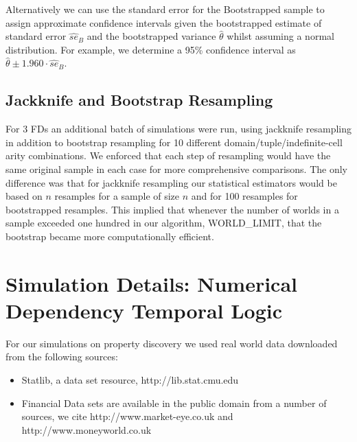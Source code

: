 \medskip

Alternatively we can use the standard error for the Bootstrapped
sample to assign approximate confidence intervals given the
bootstrapped estimate of standard error $\hat{se}_B$ and the bootstrapped variance $\hat{\theta}$ 
whilst assuming a normal distribution.  For example, we determine a 95\% 
confidence interval as $\hat{\theta} \pm 1.960 \cdot \hat{se}_B$.

\subsection{Jackknife and Bootstrap Resampling}

For 3 FDs an additional batch of simulations were run, using
jackknife resampling in addition to bootstrap resampling for 10
different domain/tuple/indefinite-cell arity combinations. We enforced
that each step of resampling would have the same original sample in
each case for more comprehensive comparisons. The only difference was
that for jackknife resampling our statistical estimators would be
based on $n$ resamples for a sample of size $n$ and for 100 resamples
for bootstrapped resamples. This implied that whenever the number of
worlds in a sample exceeded one hundred in our algorithm,
WORLD\_LIMIT, that the bootstrap became more computationally
efficient.

\section{Simulation Details: Numerical Dependency Temporal
Logic}\label{sec:sim_ndltl}

For our simulations on property discovery we used real world data
downloaded from the following sources:

\begin{itemize}
\item Statlib, a data set resource, \ttb http://lib.stat.cmu.edu\tte
\item Financial Data sets are available in the public domain from a
number of sources, we cite \ttb http://www.market-eye.co.uk \tte and
\ttb http://www.moneyworld.co.uk \tte
\end{itemize}

